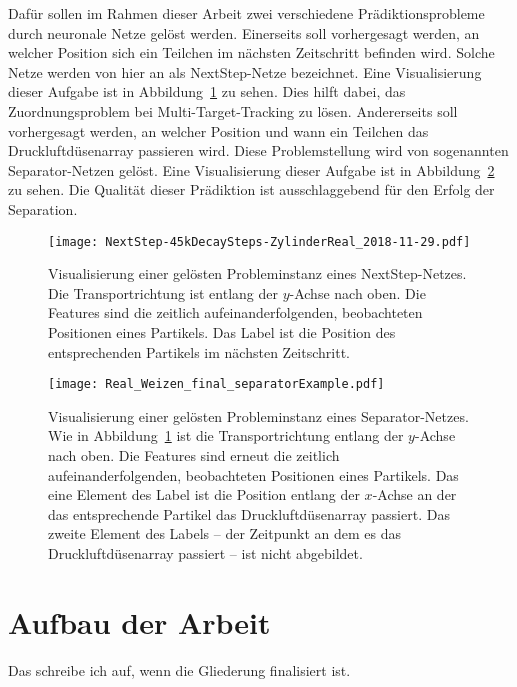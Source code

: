 Dafür sollen im Rahmen dieser Arbeit zwei verschiedene Prädiktionsprobleme durch neuronale Netze gelöst werden.
Einerseits soll vorhergesagt werden, an welcher Position sich ein Teilchen im nächsten Zeitschritt befinden wird.
Solche Netze werden von hier an als NextStep-Netze bezeichnet.
Eine Visualisierung dieser Aufgabe ist in Abbildung~\ref{fig:visualsNextstep} zu sehen.
Dies hilft dabei, das Zuordnungsproblem bei Multi-Target-Tracking zu lösen.
Andererseits soll vorhergesagt werden, an welcher Position und wann ein Teilchen das Druckluftdüsenarray passieren wird.
Diese Problemstellung wird von sogenannten Separator-Netzen gelöst.
Eine Visualisierung dieser Aufgabe ist in Abbildung~\ref{fig:visualsSeparator} zu sehen.
Die Qualität dieser Prädiktion ist ausschlaggebend für den Erfolg der Separation.


\begin{figure}[p]
    \centering
    \texttt{[image: NextStep-45kDecaySteps-ZylinderReal\_2018-11-29.pdf]}
    \caption[Visualisierung einer gelösten Probleminstanz eines NextStep-Netzes]{Visualisierung einer gelösten 
    Probleminstanz eines NextStep-Netzes. Die Transportrichtung ist entlang der \(y\)-Achse nach oben.
    Die Features sind die zeitlich aufeinanderfolgenden, beobachteten Positionen eines Partikels.
    Das Label ist die Position des entsprechenden Partikels im nächsten Zeitschritt.
    }
    \label{fig:visualsNextstep}
\end{figure}


\begin{figure}[p]
    \centering
	\texttt{[image: Real\_Weizen\_final\_separatorExample.pdf]}
    \caption[Visualisierung einer gelösten Probleminstanz eines Separator-Netzes]{Visualisierung einer gelösten Probleminstanz 
    eines Separator-Netzes.
    Wie in Abbildung~\ref{fig:visualsNextstep} ist die Transportrichtung entlang der \(y\)-Achse nach oben.
    Die Features sind erneut die zeitlich aufeinanderfolgenden, beobachteten Positionen eines Partikels.
    Das eine Element des Label ist die Position entlang der \(x\)-Achse an der das entsprechende Partikel das Druckluftdüsenarray passiert.
    Das zweite Element des Labels -- der Zeitpunkt an dem es das Druckluftdüsenarray passiert -- ist nicht abgebildet.
    }
	
	\label{fig:visualsSeparator}
\end{figure}



\section{Aufbau der Arbeit}

Das schreibe ich auf, wenn die Gliederung finalisiert ist.


